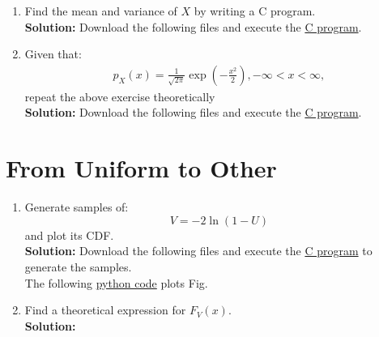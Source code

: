 \documentclass[journal,12pt,twocolumn]{IEEEtran}
\numberwithin{equation}{section}
\renewcommand\thesection{\arabic{section}}
\providecommand{\brak}[1]{\ensuremath{\left(#1\right)}}
\newcommand{\solution}{\noindent \textbf{Solution: }}
\providecommand{\link}[2]{{\color{blue}\href{https://github.com/SterbenVD/AI1110-Assignments/Assignment/#1}{#2}}}
\begin{document}
\begin{enumerate}[label=\thesection.\arabic*,ref=\thesection.\theenumi]
\begin{figure}[H]
    \caption{The PDF of $X$}
    \label{fig:2_pdf}
\end{figure}
\solution The following \link{codes/2-3.py}{python code} plots Fig. \ref{fig:2_pdf}
\\
\item Find the mean and variance of $X$ by writing a C program.
\\
\solution Download the following files and execute the \link{codes/2-3.c}{C program}.
\\
\item Given that:
\begin{align}
p_{X}(x) = \frac{1}{\sqrt{2\pi}}\exp\brak{-\frac{x^2}{2}}, -\infty < x < \infty,
\end{align}
repeat the above exercise theoretically
\\
\solution Download the following files and execute the \link{codes/2-4.c}{C program}.
\end{enumerate}

\section{From Uniform to Other}
\begin{enumerate}[label=\thesection.\arabic*,ref=\thesection.\theenumi]
\item
Generate samples of:
\begin{equation}
V = -2\ln\brak{1-U}
\end{equation}
and plot its CDF.
\\
\solution Download the following files and execute the \link{codes/3-1.c}{C program} to generate the samples. \\
The following \link{codes/3-1.py}{python code} plots Fig. %
\\
\item Find a theoretical expression for $F_V(x)$.
\\
\solution
\end{enumerate}
\end{document}
